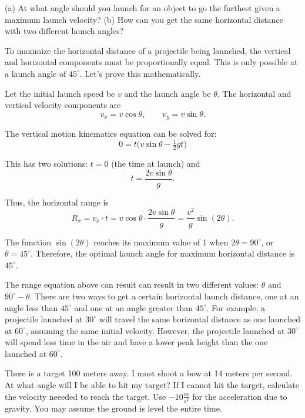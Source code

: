 \begin{Exercise}[title=Launch Angle for Maximum Range, label=projectiles_angle2]
(a) At what angle should you launch for an object to go the furthest given a maximum launch velocity? 
(b) How can you get the same horizontal distance with two different launch angles?
\end{Exercise}
\begin{Answer}[ref=projectiles_angle2]
To maximize the horizontal distance of a projectile being launched, the vertical and horizontal components must be proportionally equal. This is only possible at a launch angle of $45^\circ$. Let's prove this mathematically.

Let the initial launch speed be $v$ and the launch angle be $\theta$. The horizontal and vertical velocity components are
\[
v_x = v \cos\theta, \qquad v_y = v \sin\theta.
\]

The vertical motion kinematics equation can be solved for: 
\[
0 = t\Big(v \sin\theta - \tfrac{1}{2} g t\Big)
\]

This has two solutions: $t = 0$ (the time at launch) and
\[
t = \frac{2 v \sin\theta}{g}.
\]

Thus, the horizontal range is
\[
R_x = v_x \cdot t = v \cos\theta \cdot \frac{2 v \sin\theta}{g}
    = \frac{v^2}{g} \sin(2\theta).
\]

The function $\sin(2\theta)$ reaches its maximum value of 1 when $2\theta = 90^\circ$, or $\theta = 45^\circ$. Therefore, the optimal launch angle for maximum horizontal distance is $45^\circ$.

The range equation above can result can result in two different values: $\theta$ and $90^\circ-\theta$. There are two ways to get a certain horizontal launch distance, one at an angle less than $45^\circ$ and one at an angle greater than $45^\circ$. For example, a projectile launched at $30^\circ$ will travel the same horizontal distance as one launched at $60^\circ$, assuming the same initial velocity. However, the projectile launched at $30^\circ$ will spend less time in the air and have a lower peak height than the one launched at $60^\circ$.
\end{Answer}

\begin{Exercise}[title=Projectile Motion at an angle, label=projectiles_angle3]
There is a target 100 meters away. I must shoot a bow at 14 meters per second. At what angle will I be able to hit my target? If I cannot hit the target, calculate the velocity neeeded to reach the target. Use $-10 \frac{m}{s^2}$ for the acceleration due to gravity. You may assume the ground is level the entire time.
\end{Exercise}

